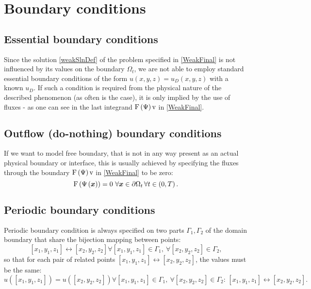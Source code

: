 \section{Boundary conditions}

\subsection{Essential boundary conditions}
Since the solution \ref{weakSlnDef} of the problem specified in \ref{WeakFinal} is not influenced by its values on the boundary $\Omega_t$, we are not able to employ standard essential boundary conditions of the form $u\left(x, y, z\right) = u_D\left(x, y, z\right)$ with a known $u_D$.
If such a condition is required from the physical nature of the described phenomenon (as often is the case), it is only implied by the use of fluxes - as one can see in the last integrand $\mathrm{F}\left(\mathrm{\Psi}\right) \mathrm{v}$ in \ref{WeakFinal}.


\subsection{Outflow (do-nothing) boundary conditions}
If we want to model free boundary, that is not in any way present as an actual physical boundary or interface, this is usually achieved by specifying the fluxes through the boundary $\mathrm{F}\left(\mathrm{\Psi}\right) \mathrm{v}$ in \ref{WeakFinal} to be zero:
$$
\mathrm{F}\lo\mathrm{\Psi}\lo\bfx\ro\ro = 0\ \forall\bfx\in\partial\Omega_t\, \forall t\in \lo0, T\ro.
$$


\subsection{Periodic boundary conditions}
Periodic boundary condition is always specified on two parts $\Gamma_1, \Gamma_2$ of the domain boundary that share the bijection mapping between points:
$$
\left[x_1, y_1, z_1\right] \leftrightarrow \left[x_2, y_2, z_2\right] \forall \left[x_1, y_1, z_1\right] \in \Gamma_1,\ \forall \left[x_2, y_2, z_2\right] \in \Gamma_2,
$$
so that for each pair of related points $\left[x_1, y_1, z_1\right] \leftrightarrow \left[x_2, y_2, z_2\right]$, the values must be the same:
$$
u\left(\left[x_1, y_1, z_1\right]\right) = u\left(\left[x_2, y_2, z_2\right]\right) \forall \left[x_1, y_1, z_1\right] \in \Gamma_1,\ \forall \left[x_2, y_2, z_2\right] \in \Gamma_2:\, \left[x_1, y_1, z_1\right] \leftrightarrow \left[x_2, y_2, z_2\right].
$$
